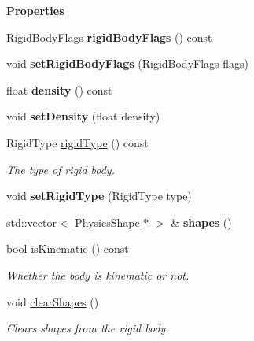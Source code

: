 \begin{Indent}\textbf{ Properties}\par
\begin{DoxyCompactItemize}
\item 
\mbox{\label{classrev_1_1_rigid_body_aec8c7ffbe347ba2f21c187983cfca5a7}} 
Rigid\+Body\+Flags {\bfseries rigid\+Body\+Flags} () const
\item 
\mbox{\label{classrev_1_1_rigid_body_a84d41dfd6c4f1ebdd59b50f3be0988a5}} 
void {\bfseries set\+Rigid\+Body\+Flags} (Rigid\+Body\+Flags flags)
\item 
\mbox{\label{classrev_1_1_rigid_body_a5408717d012caf6b1d7ceebb8bb4fb29}} 
float {\bfseries density} () const
\item 
\mbox{\label{classrev_1_1_rigid_body_a4b36b2804e5f8e58bd4483b97e189373}} 
void {\bfseries set\+Density} (float density)
\item 
Rigid\+Type \mbox{\hyperlink{classrev_1_1_rigid_body_adfc7cfb9e55c5e70818f2c2a54063468}{rigid\+Type}} () const
\begin{DoxyCompactList}\small\item\em The type of rigid body. \end{DoxyCompactList}\item 
\mbox{\label{classrev_1_1_rigid_body_aafcb9852356d9222c2721d2fd89de09a}} 
void {\bfseries set\+Rigid\+Type} (Rigid\+Type type)
\item 
\mbox{\label{classrev_1_1_rigid_body_a68564107a4fff5ef154d1d1128585136}} 
std\+::vector$<$ \mbox{\hyperlink{classrev_1_1_physics_shape}{Physics\+Shape}} $\ast$ $>$ \& {\bfseries shapes} ()
\item 
\mbox{\label{classrev_1_1_rigid_body_aa06d967f38f53d8785b28c5ac5b338e3}} 
bool \mbox{\hyperlink{classrev_1_1_rigid_body_aa06d967f38f53d8785b28c5ac5b338e3}{is\+Kinematic}} () const
\begin{DoxyCompactList}\small\item\em Whether the body is kinematic or not. \end{DoxyCompactList}\item 
void \mbox{\hyperlink{classrev_1_1_rigid_body_a662213185d960bb925af824c1372330f}{clear\+Shapes}} ()
\begin{DoxyCompactList}\small\item\em Clears shapes from the rigid body. \end{DoxyCompactList}\end{DoxyCompactItemize}
\end{Indent}
